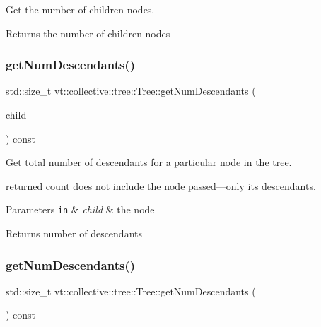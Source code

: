Get the number of children nodes. 

\begin{DoxyReturn}{Returns}
the number of children nodes 
\end{DoxyReturn}
\mbox{\label{structvt_1_1collective_1_1tree_1_1_tree_a5375e6fbda5c36891b21cc17acc204dd}} 
\subsubsection{\texorpdfstring{get\+Num\+Descendants()}{getNumDescendants()}\hspace{0.1cm}{\footnotesize\ttfamily [1/2]}}
{\footnotesize\ttfamily std\+::size\+\_\+t vt\+::collective\+::tree\+::\+Tree\+::get\+Num\+Descendants (\begin{DoxyParamCaption}\item[{\hyperlink{namespacevt_a866da9d0efc19c0a1ce79e9e492f47e2}{Node\+Type}}]{child }\end{DoxyParamCaption}) const}



Get total number of descendants for a particular node in the tree. 

returned count does not include the node passed---only its descendants.


\begin{DoxyParams}[1]{Parameters}
\mbox{\tt in}  & {\em child} & the node\\
\hline
\end{DoxyParams}
\begin{DoxyReturn}{Returns}
number of descendants 
\end{DoxyReturn}
\mbox{\label{structvt_1_1collective_1_1tree_1_1_tree_a26e27c8c2da5db17c5cc26f15c2ebfb8}} 
\subsubsection{\texorpdfstring{get\+Num\+Descendants()}{getNumDescendants()}\hspace{0.1cm}{\footnotesize\ttfamily [2/2]}}
{\footnotesize\ttfamily std\+::size\+\_\+t vt\+::collective\+::tree\+::\+Tree\+::get\+Num\+Descendants (\begin{DoxyParamCaption}{ }\end{DoxyParamCaption}) const}




